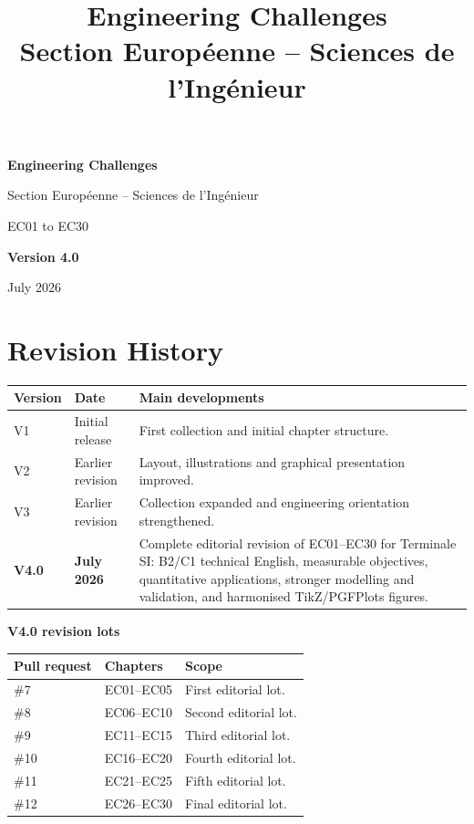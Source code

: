 \documentclass[11pt,a4paper]{article}
\title{\textbf{Engineering Challenges}\\Section Européenne -- Sciences de l'Ingénieur}
\author{}
\date{}
\begin{document}
\begin{titlepage}
\centering
\vspace*{3cm}
{\sffamily\bfseries\Huge Engineering Challenges\par}
\vspace{6mm}
{\sffamily\Large Section Européenne -- Sciences de l'Ingénieur\par}
\vfill
{\sffamily\large EC01 to EC30\par}
\vspace{8mm}
{\sffamily\bfseries\large Version 4.0\par}
\vspace{2mm}
{\sffamily\large July 2026\par}
\vspace{1cm}
\end{titlepage}

\clearpage
{}
{}
\section*{Revision History}

\begin{center}
\renewcommand{\arraystretch}{1.35}
\begin{tabularx}{\textwidth}{@{}l l X@{}}
\textbf{Version} & \textbf{Date} & \textbf{Main developments}\\
\hline
V1 & Initial release & First collection and initial chapter structure.\\
V2 & Earlier revision & Layout, illustrations and graphical presentation improved.\\
V3 & Earlier revision & Collection expanded and engineering orientation strengthened.\\
\textbf{V4.0} & \textbf{July 2026} & Complete editorial revision of EC01--EC30 for Terminale SI: B2/C1 technical English, measurable objectives, quantitative applications, stronger modelling and validation, and harmonised TikZ/PGFPlots figures.\\
\end{tabularx}
\end{center}

\vspace{6mm}
\noindent\textbf{V4.0 revision lots}

\begin{center}
\renewcommand{\arraystretch}{1.2}
\begin{tabularx}{\textwidth}{@{}l l X@{}}
\textbf{Pull request} & \textbf{Chapters} & \textbf{Scope}\\
\hline
\#7 & EC01--EC05 & First editorial lot.\\
\#8 & EC06--EC10 & Second editorial lot.\\
\#9 & EC11--EC15 & Third editorial lot.\\
\#10 & EC16--EC20 & Fourth editorial lot.\\
\#11 & EC21--EC25 & Fifth editorial lot.\\
\#12 & EC26--EC30 & Final editorial lot.\\
\end{tabularx}
\end{center}
\end{document}
